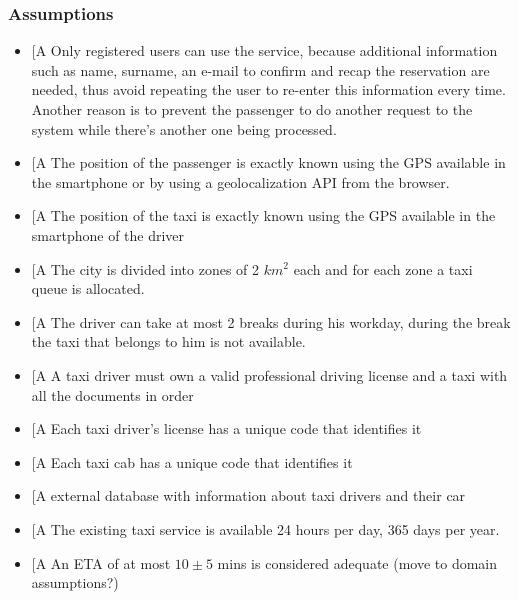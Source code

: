 \documentclass[a4paper,12pt]{article}%
\newcounter{assumptions_counter}
\begin{document}
\subsubsection{Assumptions}
\begin{itemize}
\item \label{a\arabic{assumptions_counter}}{[}A\arabic{assumptions_counter}{]}
Only registered users can use the service, because additional information such as name, surname, an e-mail to confirm and recap the reservation are needed, thus avoid repeating the user to re-enter this information every time.
Another reason is to prevent the passenger to do another request to the system while there’s another one being processed.
\item \label{a\arabic{assumptions_counter}}{[}A\arabic{assumptions_counter}{]} The position of the passenger is exactly known using the GPS available in the smartphone or by using a geolocalization API from the browser. 
\item \label{a\arabic{assumptions_counter}}{[}A\arabic{assumptions_counter}{]} The position of the taxi is exactly known using the GPS available in the smartphone of the driver
\item \label{a\arabic{assumptions_counter}}{[}A\arabic{assumptions_counter}{]} The city is divided into zones of 2 $km^2$ each and for each zone a taxi queue is allocated.
\item \label{a\arabic{assumptions_counter}}{[}A\arabic{assumptions_counter}{]} The driver can take at most 2 breaks during his workday, during the break the taxi that belongs to him is not available.
\item \label{a\arabic{assumptions_counter}}{[}A\arabic{assumptions_counter}{]} A taxi driver must own a valid professional driving license and a taxi with all the documents in order
\item \label{a\arabic{assumptions_counter}}{[}A\arabic{assumptions_counter}{]} Each taxi driver's license has a unique code that identifies it
\item \label{a\arabic{assumptions_counter}}{[}A\arabic{assumptions_counter}{]} Each taxi cab has a unique code that identifies it
\item \label{a\arabic{assumptions_counter}}{[}A\arabic{assumptions_counter}{]} external database with information about taxi drivers and their car 
\item \label{a\arabic{assumptions_counter}}{[}A\arabic{assumptions_counter}{]} The existing taxi service is available 24 hours per day, 365 days per year.
\item \label{a\arabic{assumptions_counter}}{[}A\arabic{assumptions_counter}{]} An ETA of at most $10 \pm 5$ mins is considered adequate (move to domain assumptions?)
\end{itemize}
\end{document}
